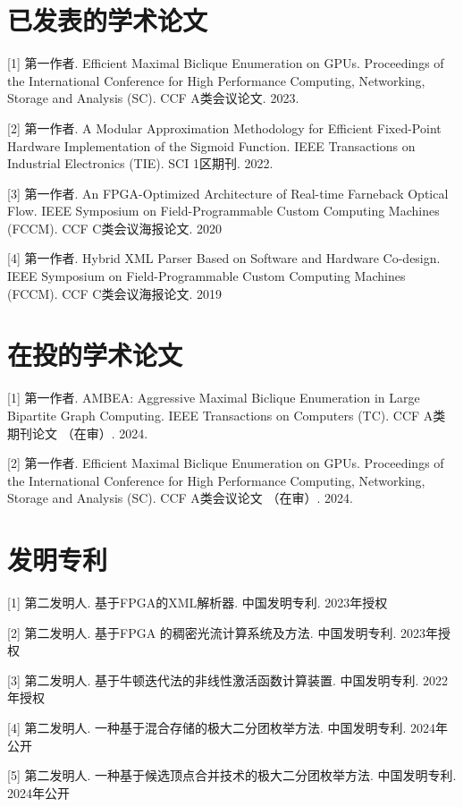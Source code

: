 \cleardoublepage
{}

\section*{已发表的学术论文}

[1] 第一作者. Efficient Maximal Biclique Enumeration on GPUs. Proceedings of the International Conference for High Performance Computing, Networking, Storage and Analysis (SC). CCF A类会议论文. 2023.

[2] 第一作者. A Modular Approximation Methodology for Efficient Fixed-Point Hardware Implementation of the Sigmoid Function. IEEE Transactions on Industrial Electronics (TIE). SCI 1区期刊. 2022.

[3] 第一作者. An FPGA-Optimized Architecture of Real-time Farneback Optical Flow. IEEE Symposium on Field-Programmable Custom Computing Machines (FCCM). CCF C类会议海报论文. 2020

[4] 第一作者. Hybrid XML Parser Based on Software and Hardware Co-design. IEEE Symposium on Field-Programmable Custom Computing Machines (FCCM). CCF C类会议海报论文. 2019

\section*{在投的学术论文}
[1] 第一作者. AMBEA: Aggressive Maximal Biclique Enumeration in Large Bipartite Graph Computing. IEEE Transactions on Computers (TC). CCF A类期刊论文 （在审）. 2024.

[2] 第一作者. Efficient Maximal Biclique Enumeration on GPUs. Proceedings of the International Conference for High Performance Computing, Networking, Storage and Analysis (SC). CCF A类会议论文 （在审）. 2024.


\section*{发明专利}

[1] 第二发明人. 基于FPGA的XML解析器. 中国发明专利. 2023年授权

[2] 第二发明人. 基于FPGA 的稠密光流计算系统及方法. 中国发明专利. 2023年授权

[3] 第二发明人. 基于牛顿迭代法的非线性激活函数计算装置. 中国发明专利. 2022年授权

[4] 第二发明人. 一种基于混合存储的极大二分团枚举方法. 中国发明专利. 2024年公开

[5] 第二发明人. 一种基于候选顶点合并技术的极大二分团枚举方法. 中国发明专利. 2024年公开

